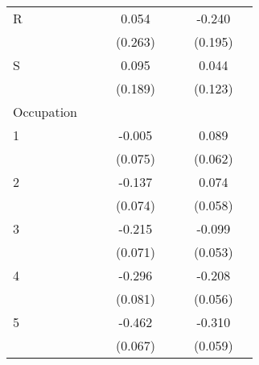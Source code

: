 {\begin{longtable}{l*{3}{c}|l*{3}{c}}
		R                   &                     &                     &       0.054         &                     &                     &      -0.240         \\
		&                     &                     &     (0.263)         &                     &                     &     (0.195)         \\
		S                   &                     &                     &       0.095         &                     &                     &       0.044         \\
		&                     &                     &     (0.189)         &                     &                     &     (0.123)         \\
		Occupation &&&&&\\
		1                   &                     &                     &      -0.005         &                     &                     &       0.089         \\
		&                     &                     &     (0.075)         &                     &                     &     (0.062)         \\
		2                   &                     &                     &      -0.137         &                     &                     &       0.074         \\
		&                     &                     &     (0.074)         &                     &                     &     (0.058)         \\
		3                   &                     &                     &      -0.215\sym{**} &                     &                     &      -0.099         \\
		&                     &                     &     (0.071)         &                     &                     &     (0.053)         \\
		4                   &                     &                     &      -0.296\sym{***}&                     &                     &      -0.208\sym{***}\\
		&                     &                     &     (0.081)         &                     &                     &     (0.056)         \\
		5                   &                     &                     &      -0.462\sym{***}&                     &                     &      -0.310\sym{***}\\
		&                     &                     &     (0.067)         &                     &                     &     (0.059)         \\

\end{longtable}}
